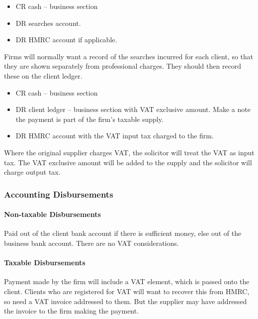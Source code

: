 \documentclass[
]{article}
\providecommand{\tightlist}{%
  \setlength{\itemsep}{0pt}\setlength{\parskip}{0pt}}
\begin{document}
\begin{itemize}
\tightlist
\item
  CR cash -- business section
\item
  DR searches account.
\item
  DR HMRC account if applicable.
\end{itemize}

Firms will normally want a record of the searches incurred for each
client, so that they are shown separately from professional charges.
They should then record these on the client ledger.

\begin{itemize}
\tightlist
\item
  CR cash -- business section
\item
  DR client ledger -- business section with VAT exclusive amount. Make a
  note the payment is part of the firm's taxable supply.
\item
  DR HMRC account with the VAT input tax charged to the firm.
\end{itemize}

Where the original supplier charges VAT, the solicitor will treat the
VAT as input tax. The VAT exclusive amount will be added to the supply
and the solicitor will charge output tax.

\hypertarget{accounting-disbursements}{%
\subsubsection{Accounting
Disbursements}\label{accounting-disbursements}}

\hypertarget{non-taxable-disbursements}{%
\paragraph{Non-taxable Disbursements}\label{non-taxable-disbursements}}

Paid out of the client bank account if there is sufficient money, else
out of the business bank account. There are no VAT considerations.

\hypertarget{taxable-disbursements}{%
\paragraph{Taxable Disbursements}\label{taxable-disbursements}}

Payment made by the firm will include a VAT element, which is passed
onto the client. Clients who are registered for VAT will want to recover
this from HMRC, so need a VAT invoice addressed to them. But the
supplier may have addressed the invoice to the firm making the payment.
\end{document}
